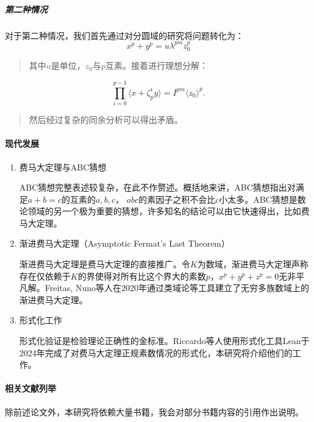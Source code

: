 \documentclass{article}
\begin{document}
\subparagraph{第二种情况} 对于第二种情况，我们首先通过对分圆域的研究将问题转化为：
$$
x^p + y^p = u \lambda^{pm} z_0^{p}
$$
\begin{quote}
其中$u$是单位，$z_0$与$p$互素。接着进行理想分解：
\end{quote}
$$
\prod_{i=0}^{p-1}\langle x+\zeta_p^iy\rangle = I^{pm} \langle z_0\rangle^p.
$$
\begin{quote}
然后经过复杂的同余分析可以得出矛盾。
\end{quote}

\paragraph{现代发展}

\begin{enumerate}
\item 费马大定理与ABC猜想

ABC猜想完整表述较复杂，在此不作赘述。概括地来讲，ABC猜想指出对满足$a+b=c$的互素的$a, b, c$， $abc$的素因子之积不会比$c$小太多。ABC猜想是数论领域的另一个极为重要的猜想，许多知名的结论可以由它快速得出，比如费马大定理\cite{ref11}。

\item 渐进费马大定理（Asymptotic Fermat's Last Theorem）

渐进费马大定理是费马大定理的直接推广。令$K$为数域，渐进费马大定理声称存在仅依赖于$K$的界使得对所有比这个界大的素数$p$，$x^p + y^p + z^p=0$无非平凡解。Freitas, Nuno等人在2020年通过类域论等工具建立了无穷多族数域上的渐进费马大定理\cite{ref10}。

\item 形式化工作

形式化验证是检验理论正确性的金标准。Riccardo等人使用形式化工具Lean于2024年完成了对费马大定理正规素数情况的形式化，本研究将介绍他们的工作\cite{ref12}。

\end{enumerate}

\paragraph{相关文献列举} 除前述论文外，本研究将依赖大量书籍，我会对部分书籍内容的引用作出说明。
\end{document}
